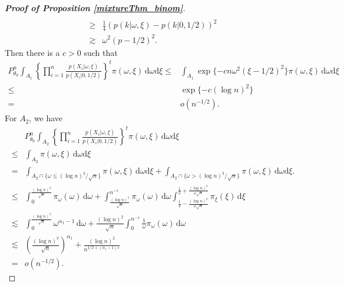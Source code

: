 \documentclass[11pt]{article}
\theoremstyle{plain}
\theoremstyle{definition}
\theoremstyle{remark}
\begin{document}
\begin{appendices}
\begin{proof}[\textbf{Proof of Proposition \ref{mixtureThm_binom}}]
\begin{align*}
\\
\geq&
\frac{1}{4}
 \left({p( k |\omega, \xi) }-{p( k |0, 1/2 )}\right)^2 
\\
\gtrsim&
\omega^2
\left( p - 1/2 \right)^2 
.
\end{align*}
Then there is a $c>0$ such that
\begin{equation*}
    \begin{split}
        P^n_{\theta_0} \int_{A_1} \left\{\prod_{i=1}^n \frac{p(X_i|\omega, \xi)}{p(X_i|0, 1/2 )}\right\}^t \pi(\omega, \xi)\, \mathrm d\omega \mathrm d \xi
    \leq &
    \int_{A_1} 
    \exp\{ - c n \omega^2 \left( \xi - 1/2 \right)^2 \}
    \pi(\omega, \xi)\, \mathrm d\omega \mathrm d \xi
    \\
    \leq &
    \exp\{ - c (\log n)^2 \}
    \\
    = &
    o(n^{-1/2})
    .
    \end{split}
\end{equation*}
For $A_2$, we have
\begin{equation*}
    \begin{split}
        &
        P^n_{\theta_0} \int_{A_2} \left\{\prod_{i=1}^n \frac{p(X_i|\omega, \xi)}{p(X_i|0, 1/2 )}\right\}^t \pi(\omega, \xi)\, \mathrm d\omega \mathrm d \xi
        \\
    \leq&
    \int_{A_2}  \pi(\omega, \xi)\, \mathrm d\omega \mathrm d \xi
    \\
    =&
    \int_{A_2\cap\{\omega\leq  (\log n)^3 / \sqrt n\}}  \pi(\omega, \xi)\, \mathrm d\omega \mathrm d \xi
    +
    \int_{A_2\cap\{\omega>  (\log n)^3 / \sqrt n\}}  \pi(\omega, \xi)\, \mathrm d\omega \mathrm d \xi
    .
    \\
    \leq&
    \int_{0}^{ \frac{ (\log n)^3}{\sqrt n}} \pi_\omega(\omega)  \, \mathrm d\omega
    +
    \int_{\frac{(\log n)^3}{\sqrt n}}^{n^{-s}} \pi_\omega(\omega)  \, \mathrm d\omega
    \int_{\frac 1 2 - \frac{(\log n)^2}{\omega \sqrt n}}^{\frac 1 2 + \frac{(\log n)^2}{\omega \sqrt n}}
    \pi_\xi (\xi)\, \mathrm d \xi
    \\
    \lesssim &
    \int_{0}^{ \frac{ (\log n)^3}{\sqrt n}} \omega^{\alpha_1 - 1 } \, \mathrm d\omega
    +
\frac{(\log n)^2}{ \sqrt n}
\int_{0}^{n^{-s}} \frac{1}{\omega} \pi_\omega(\omega)  \, \mathrm d\omega
    \\
    \lesssim &
    \left({ \frac{ (\log n)^3}{\sqrt n}}\right)^{\alpha_1}
    +
    \frac{(\log n)^2}{ n^{1/2+(\alpha_1 - 1)s}}
    \\
    =& o(n^{-1/2})
    .
    \end{split}
\end{equation*}


\end{proof}
\end{appendices}
\end{document}
